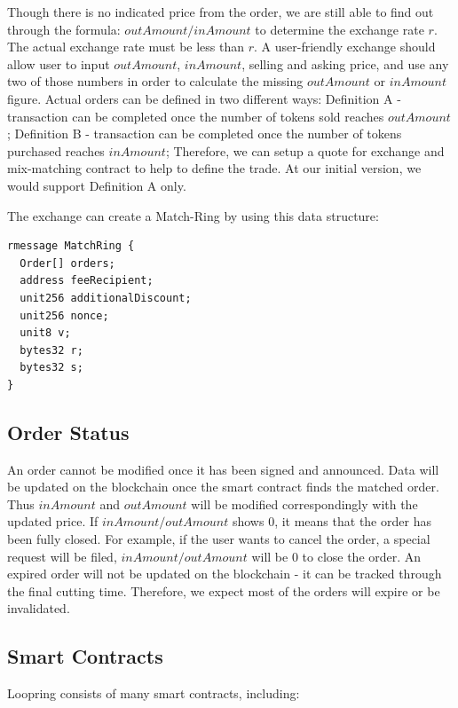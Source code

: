\documentclass[UTF8,nofonts]{article}
\begin{document}
Though there is no indicated price from the order, we are still able to find out through the formula: $outAmount / inAmount$ to determine the exchange rate $r$. The actual exchange rate must be less than $r$. A user-friendly exchange should allow user to input $outAmount$, $inAmount$, selling and asking price, and use any two of those numbers in order to calculate the missing $outAmount$ or $inAmount$ figure.
Actual orders can be defined in two different ways: Definition A - transaction can be completed once the number of tokens sold reaches $outAmount$ ; Definition B - transaction can be completed once the number of tokens purchased reaches $inAmount$; Therefore, we can setup a quote for exchange and mix-matching contract to help to define the trade. At our initial version, we would support Definition A only.

The exchange can create a Match-Ring by using this data structure:
\begin{verbatim}
rmessage MatchRing {
  Order[] orders;
  address feeRecipient;
  unit256 additionalDiscount;
  unit256 nonce;
  unit8 v;
  bytes32 r;
  bytes32 s;
}
\end{verbatim}


\subsection{Order Status\label{sec: orderstate}}


An order cannot be modified once it has been signed and announced. Data will be updated on the blockchain once the smart contract finds the matched order. Thus $inAmount$ and $outAmount$ will be modified correspondingly with the updated price. If $inAmount / outAmount$ shows 0,  it means that the order has been fully closed. For example, if the user wants to cancel the order, a special request will be filed,  $inAmount / outAmount$ will be 0 to close the order. An expired order will not be updated on the blockchain - it can be tracked through the final cutting time. Therefore, we expect most of the orders will expire or be invalidated.

\subsection{Smart Contracts\label{sec: contracts}}

Loopring consists of many smart contracts, including:
\end{document}
